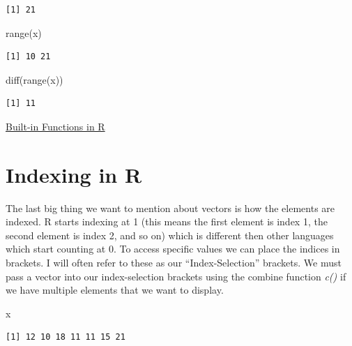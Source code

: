 \documentclass[
  letterpaper,
  DIV=11,
  numbers=noendperiod]{scrreprt}
\newenvironment{Shaded}{\begin{snugshade}}{\end{snugshade}}
\newcommand{\FunctionTok}[1]{\textcolor[rgb]{0.28,0.35,0.67}{#1}}
\newcommand{\NormalTok}[1]{\textcolor[rgb]{0.00,0.23,0.31}{#1}}
\begin{document}
\begin{verbatim}
[1] 21
\end{verbatim}

\begin{Shaded}
\begin{Highlighting}[]
\FunctionTok{range}\NormalTok{(x)}
\end{Highlighting}
\end{Shaded}

\begin{verbatim}
[1] 10 21
\end{verbatim}

\begin{Shaded}
\begin{Highlighting}[]
\FunctionTok{diff}\NormalTok{(}\FunctionTok{range}\NormalTok{(x))}
\end{Highlighting}
\end{Shaded}

\begin{verbatim}
[1] 11
\end{verbatim}

\begin{watch}{}{}
    \href{https://youtu.be/pwgSeoNjwPo}{Built-in Functions in R}
\end{watch}

\section{Indexing in R}\label{indexing-in-r}

The last big thing we want to mention about vectors is how the elements
are indexed. R starts indexing at 1 (this means the first element is
index 1, the second element is index 2, and so on) which is different
then other languages which start counting at 0. To access specific
values we can place the indices in brackets. I will often refer to these
as our ``Index-Selection'' brackets. We must pass a vector into our
index-selection brackets using the combine function \emph{c()} if we
have multiple elements that we want to display.

\begin{Shaded}
\begin{Highlighting}[]
\NormalTok{x}
\end{Highlighting}
\end{Shaded}

\begin{verbatim}
[1] 12 10 18 11 11 15 21
\end{verbatim}
\end{document}

